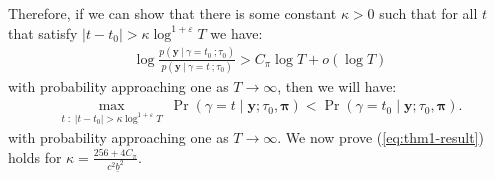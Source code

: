 Therefore, if we can show that there is some constant $\kappa > 0$ such that for all $t$ that satisfy $|t - t_0| > \kappa\log^{1+\varepsilon} T$ we have:
\begin{align}
    \log \frac{p(\mathbf{y} \:|\:\gamma = t_0 \:; \tau_0)}{p(\mathbf{y} \:|\:\gamma = t \:; \tau_0)} > C_\pi \log T + o(\log T) \label{eq:thm1-result}
\end{align}
with probability approaching one as $T \to \infty$, then we will have:
\begin{align*}
    \max_{t \;:\; |t - t_0| > \kappa \log^{1+\varepsilon} T} \; \Pr(\gamma = t  \;|\; \mathbf{y} ; \tau_0,\pmb{\pi}) < \Pr(\gamma = t_0  \;|\; \mathbf{y} ; \tau_0,\pmb{\pi}).
\end{align*}
with probability approaching one as $T \to \infty$. We now prove (\ref{eq:thm1-result}) holds for $\kappa = \frac{256 + 4C_\pi}{c^2\underline{b}^2}$.

